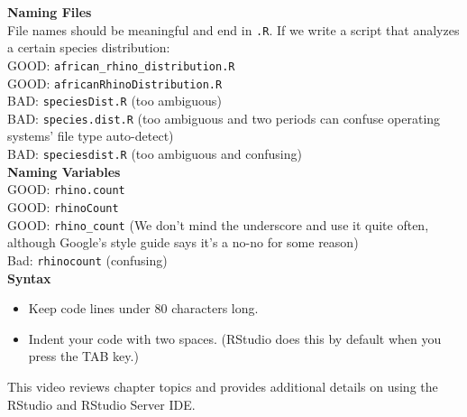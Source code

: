 {\setlength{\parindent}{0cm}
\textbf{Naming Files} \\
File names should be meaningful and end in \verb+.R+. If we write a script that analyzes a certain species distribution: \\
GOOD: {\color[RGB]{34,139,34}\verb+african_rhino_distribution.R+} \\
GOOD: {\color[RGB]{34,139,34}\verb+africanRhinoDistribution.R+} \\
BAD: {\color{red}\verb+speciesDist.R+} (too ambiguous)\\
BAD:  {\color{red}\verb+species.dist.R+} (too ambiguous and two periods can confuse operating systems' file type auto-detect)\\
BAD:  {\color{red}\verb+speciesdist.R+} (too ambiguous and confusing)\\

\textbf{Naming Variables} \\
GOOD: {\color[RGB]{34,139,34}\verb+rhino.count+} \\
GOOD: {\color[RGB]{34,139,34}\verb+rhinoCount+} \\
GOOD: {\color[RGB]{34,139,34}\verb+rhino_count+} (We don't mind the underscore and use it quite often, although Google's style guide says it's a no-no for some reason)\\
Bad: {\color{red}\verb+rhinocount+} (confusing)\\

\textbf{Syntax} 
\begin{itemize}
\item Keep code lines under 80 characters long.
\item Indent your code with two spaces. (RStudio does this by default when you press the TAB key.)
\end{itemize}
}

\begin{vid}{
    This video reviews chapter topics and provides additional details on using the RStudio and RStudio Server IDE.}
\end{vid}
